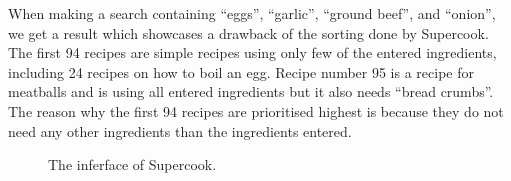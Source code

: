 When making a search containing ``eggs'', ``garlic'', ``ground beef'', and ``onion'', we get a result which showcases a drawback of the sorting done by Supercook. The first 94 recipes are simple recipes using only few of the entered ingredients, including 24 recipes on how to boil an egg. Recipe number 95 is a recipe for meatballs and is using all entered ingredients but it also needs ``bread crumbs''. The reason why the first 94 recipes are prioritised highest is because they do not need any other ingredients than the ingredients entered.
\begin{figure}[H]
\centering
{}
\caption{The inferface of Supercook.}
\label{fig:supercook}
\end{figure}

